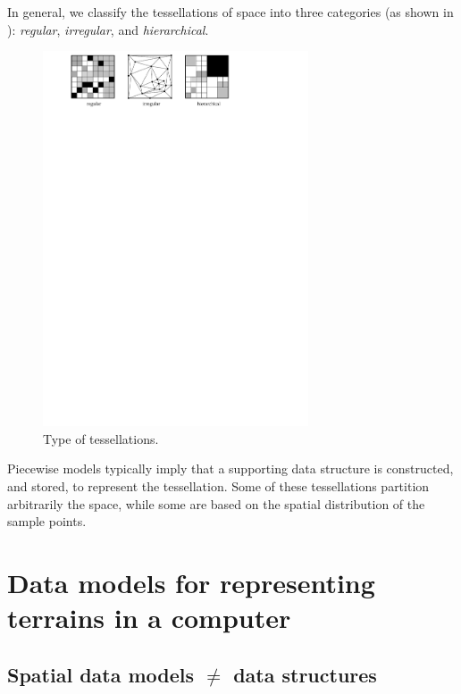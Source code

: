 %

In general, we  classify the tessellations of space into three categories (as shown in ): \emph{regular}, \emph{irregular}, and \emph{hierarchical}.
\begin{figure}
  \centering
  \includegraphics[width=0.7\textwidth]{figs/tesstype}
  \caption{Type of tessellations.} 
\label{fig:tesstypes}
\end{figure}

%

Piecewise models typically imply that a supporting data structure is constructed, and stored, to represent the tessellation.
Some of these tessellations partition arbitrarily the space, while some are based on the spatial distribution of the sample points.


%
\section{Data models for representing terrains in a computer}

\subsection{Spatial data models $\neq$ data structures}

